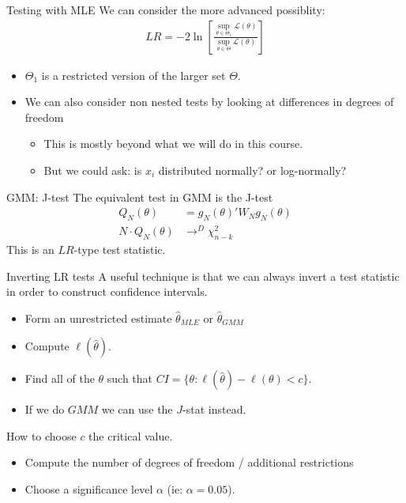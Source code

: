 \begin{frame}{Testing with MLE}
We can consider the more advanced possiblity:
\begin{align*}
L R=-2 \ln \left[\frac{\sup _{\theta \in \Theta_{1}} \mathcal{L}(\theta)}{\sup _{\theta \in \Theta} \mathcal{L}(\theta)}\right]
\end{align*}
\begin{itemize}
\item $\Theta_1$ is a restricted version of the larger set $\Theta$.
\item We can also consider \alert{non nested tests} by looking at differences in \alert{degrees of freedom}
\begin{itemize}
\item This is mostly beyond what we will do in this course.
\item But we could ask: is $x_i$ distributed normally? or log-normally?
\end{itemize}
\end{itemize}
\end{frame}

\begin{frame}{GMM: J-test}
The equivalent test in GMM is the \alert{J-test}
\begin{align*}
Q_N(\theta)&=g_N(\theta)' W_N  g_N(\theta) \\
N \cdot Q_N(\theta) &\rightarrow^D \chi^2_{n-k}
\end{align*}
This is an $LR$-type test statistic.
\end{frame}


\begin{frame}{Inverting LR tests}
A useful technique is that we can always \alert{invert} a test statistic in order to construct confidence intervals.
\begin{itemize}
\item Form an unrestricted estimate $\widehat{\theta}_{MLE}$ or $\widehat{\theta}_{GMM}$
\item Compute $\ell(\widehat{\theta})$.
\item Find all of the $\theta$ such that  $CI=\{\theta: \ell(\widehat{\theta}) -  \ell(\theta) < c \}$.
\item If we do $GMM$ we can use the $J$-stat instead.
\end{itemize}
How to choose $c$ the \alert{critical value}.
\begin{itemize}
\item Compute the number of degrees of freedom / additional restrictions
\item Choose a significance level $\alpha$ (ie: $\alpha=0.05$).
\end{itemize}
\end{frame}


